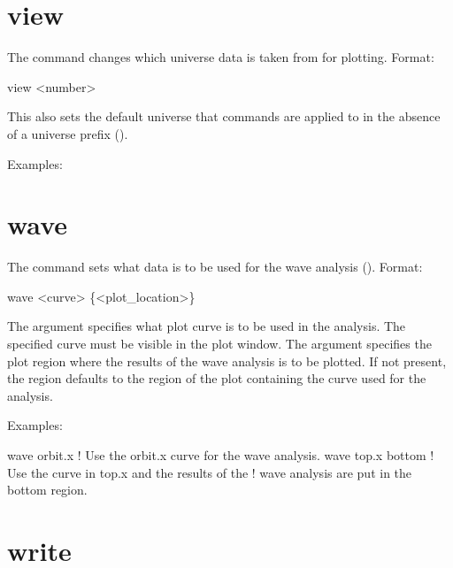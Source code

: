 {{{%
\section{view}
\label{s:view}

The  command changes which universe data is taken from for
plotting. Format:
\begin{example}
  view <number>
\end{example}

\vskip 0.1in 

This also sets the default universe that commands are applied to in
the absence of a universe prefix ().

Examples:

\section{wave}
\label{s:wave}

The  command sets what data is to be used for the wave
analysis (). Format:
\begin{example}
  wave <curve> \{<plot_location>\}
\end{example}

\vskip 0.1in

The  argument specifies what plot curve is to be used in
the analysis. The specified curve must be visible in the plot window.
The  argument specifies the plot region where the
results of the wave analysis is to be plotted. If not present, the
region defaults to the region of the plot containing the curve used
for the analysis.

Examples:
\begin{example}
  wave orbit.x      ! Use the orbit.x curve for the wave analysis.
  wave top.x bottom ! Use the curve in top.x and the results of the 
                    !  wave analysis are put in the bottom region.
\end{example}

\section{write}
\label{s:write}

}}}
